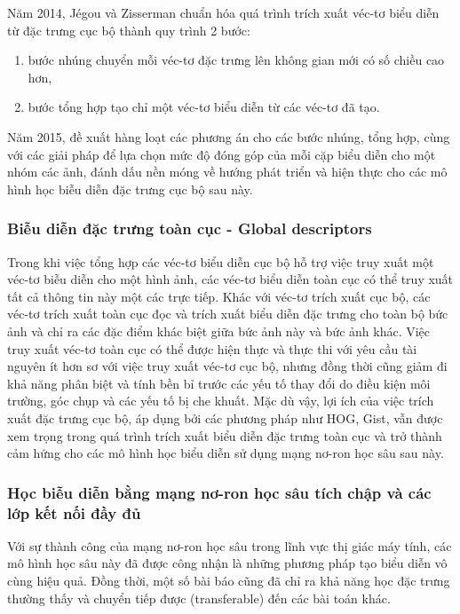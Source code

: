 Năm 2014, Jégou và Zisserman chuẩn hóa quá trình trích xuất véc-tơ biểu diễn từ đặc trưng cục bộ thành quy trình 2 bước\cite{Jegou_2014_CVPR}:

\begin{enumerate}
    \item bước nhúng chuyển mỗi véc-tơ đặc trưng lên không gian mới có số chiều cao hơn,
    \item bước tổng hợp tạo chỉ một véc-tơ biểu diễn từ các véc-tơ đã tạo.
\end{enumerate}

Năm 2015, \cite{selective-match-kernel} đề xuất hàng loạt các phương án cho các bước nhúng, tổng hợp, cùng với các giải pháp để lựa chọn mức độ đóng góp của mỗi cặp biểu diễn cho một nhóm các ảnh, đánh dấu nền móng về hướng phát triển và hiện thực cho các mô hình học biễu diễn đặc trưng cục bộ sau này.

\subsubsection{Biễu diễn đặc trưng toàn cục  - Global descriptors}

Trong khi việc tổng hợp các véc-tơ biểu diễn cục bộ hỗ trợ việc truy xuất một véc-tơ biễu diễn cho một hình ảnh, các véc-tơ biểu diễn toàn cục có thể truy xuất tất cả thông tin này một các trực tiếp. Khác với véc-tơ trích xuất cục bộ, các véc-tơ trích xuất toàn cục đọc và trích xuất biểu diễn đặc trưng cho toàn bộ bức ảnh và chỉ ra các đặc điểm khác biệt giữa bức ảnh này và bức ảnh khác. Việc truy xuất véc-tơ toàn cục có thể được hiện thực và thực thi với yêu cầu tài nguyên ít hơn sơ với việc truy xuất véc-tơ cục bộ, nhưng đồng thời cũng giảm đi khả năng phân biệt và tính bền bỉ trước các yếu tố thay đổi do điều kiện môi trường, góc chụp và các yếu tố bị che khuất. Mặc dù vậy, lợi ích của việc trích xuất đặc trưng cục bộ, áp dụng bởi các phương pháp như HOG\cite{HOG}, Gist\cite{GIST}, vẫn được xem trọng trong quá trình trích xuất biểu diễn đặc trưng toàn cục và trở thành cảm hứng cho các mô hình học biểu diễn sử dụng mạng nơ-ron học sâu sau này.

\subsubsection{Học biễu diễn bằng mạng nơ-ron học sâu tích chập và các lớp kết nối đầy đủ}

Với sự thành công của mạng nơ-ron học sâu trong lĩnh vực thị giác máy tính\cite{krizhevsky2012imagenet}, các mô hình học sâu này đã được công nhận là những phương pháp tạo biểu diễn vô cùng hiệu quả. Đồng thời, một số bài báo cũng đã chỉ ra khả năng học đặc trưng thường thấy và chuyển tiếp được (transferable) đến các bài toán khác\cite{Oquab_2014_CVPR,ZeilerVisualizingAU,Chen2018DeepLabSI}.

